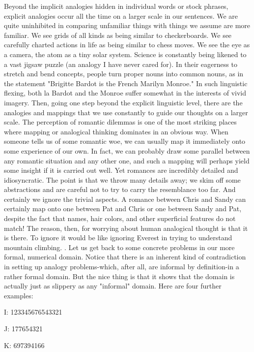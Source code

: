         Beyond the implicit analogies hidden in individual words or stock phrases,
explicit analogies occur all the time on a larger scale in our sentences. We are quite
uninhibited in comparing unfamiliar things with things we assume are more familiar.
We see grids of all kinds as being similar to checkerboards. We see carefully charted
actions in life as being similar to chess moves. We see the eye as a camera, the atom
as a tiny solar system. Science is constantly being likened to a vast jigsaw puzzle (an
analogy I have never cared for). In their eagerness to stretch and bend concepts,
people turn proper nouns into common nouns, as in the statement "Brigitte Bardot is
the French Marilyn Monroe." In such linguistic flexing, both la Bardot and the
Monroe suffer somewhat in the interests of vivid imagery.
        Then, going one step beyond the explicit linguistic level, there are the
analogies and mappings that we use constantly to guide our thoughts on a larger scale.
The perception of romantic dilemmas is one of the most striking places where
mapping or analogical thinking dominates in an obvious way. When someone tells us
of some romantic woe, we can usually map it immediately onto some experience of
our own. In fact, we can probably draw some parallel between any romantic situation
and any other one, and such a mapping will perhaps yield some insight if it is carried
out well. Yet romances are incredibly detailed and idiosyncratic. The point is that we
throw many details away; we skim off some abstractions and are careful not to try to
carry the resemblance too far. And certainly we ignore the trivial aspects. A romance
between Chris and Sandy can certainly map onto one between Pat and Chris or one
between Sandy and Pat, despite the fact that names, hair colors, and other superficial
features do not match!
        The reason, then, for worrying about human analogical thought is that it is
there. To ignore it would be like ignoring Everest in trying to understand mountain
climbing.
        . Let us get back to some concrete problems in our more formal, numerical
domain. Notice that there is an inherent kind of contradiction in setting up analogy
problems-which, after all, are informal by definition-in a rather formal domain. But
the nice thing is that it shows that the domain is actually just as slippery as any
"informal" domain. Here are four further examples:

       I:    123345676543321

       J:    177654321

       K:    697394166

